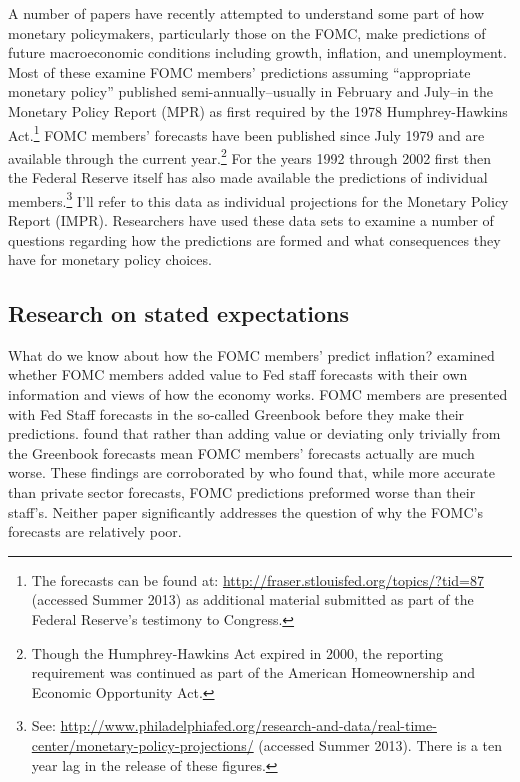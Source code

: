 \documentclass[a4paper]{article}\usepackage[]{graphicx}\usepackage[]{color}
\begin{document}
A number of papers have recently attempted to understand some part of how monetary policymakers, particularly those on the FOMC, make predictions of future macroeconomic conditions including growth, inflation, and unemployment. Most of these examine FOMC members' predictions assuming ``appropriate monetary policy'' published semi-annually--usually in February and July--in the Monetary Policy Report (MPR) as first required by the 1978  Humphrey-Hawkins Act.\footnote{The forecasts can be found at: \url{http://fraser.stlouisfed.org/topics/?tid=87} (accessed Summer 2013) as additional material submitted as part of the Federal Reserve's testimony to Congress.} FOMC members' forecasts have been published since July 1979 and are available through the current year.\footnote{Though the Humphrey-Hawkins Act expired in 2000, the reporting requirement was continued as part of the American Homeownership and Economic Opportunity Act.} For the years 1992 through 2002 first \cite{Romer2010Data} then the Federal Reserve itself has also made available the predictions of individual members.\footnote{See: \url{http://www.philadelphiafed.org/research-and-data/real-time-center/monetary-policy-projections/} (accessed Summer 2013). There is a ten year lag in the release of these figures.} I'll refer to this data as individual projections for the Monetary Policy Report (IMPR). Researchers have used these data sets to examine a number of questions regarding how the predictions are formed and what consequences they have for monetary policy choices. 

\subsection{Research on stated expectations}

What do we know about how the FOMC members' predict inflation? \cite{RomerRomer2008} examined whether FOMC members added value to Fed staff forecasts with their own information and views of how the economy works. FOMC members are presented with Fed Staff forecasts in the so-called Greenbook before they make their predictions. \cite{RomerRomer2008} found that rather than adding value or deviating only trivially from the Greenbook forecasts mean FOMC members' forecasts actually are much worse. These findings are corroborated by \cite{Gavin2003} who found that, while more accurate than private sector forecasts, FOMC predictions preformed worse than their staff's. Neither paper significantly addresses the question of why the FOMC's forecasts are relatively poor. 
\end{document}
